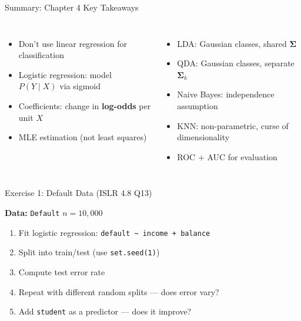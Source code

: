 \documentclass[aspectratio=169, 11pt]{beamer}
\begin{document}
\begin{frame}{Summary: Chapter 4 Key Takeaways}

\begin{columns}
\begin{itemize}
  \item Don't use linear regression for classification
  \item Logistic regression: model $P(Y \mid X)$ via sigmoid
  \item Coefficients: change in \textbf{log-odds} per unit $X$
  \item MLE estimation (not least squares)
\end{itemize}

\begin{itemize}
  \item LDA: Gaussian classes, shared $\boldsymbol{\Sigma}$
  \item QDA: Gaussian classes, separate $\boldsymbol{\Sigma}_k$
  \item Naive Bayes: independence assumption
  \item KNN: non-parametric, curse of dimensionality
  \item ROC + AUC for evaluation
\end{itemize}
\end{columns}

\vspace{0.8em}
\centering
{}
\end{frame}


\begin{frame}{Exercise 1: Default Data (ISLR 4.8 Q13)}

\textbf{Data:} \texttt{Default} \hfill $n = 10{,}000$

\begin{enumerate}
  \item Fit logistic regression: \texttt{default \textasciitilde{} income + balance}
  \item Split into train/test (use \texttt{set.seed(1)})
  \item Compute test error rate
  \item Repeat with different random splits --- does error vary?
  \item Add \texttt{student} as a predictor --- does it improve?
\end{enumerate}

\vspace{0.3em}
\end{frame}
\end{document}

